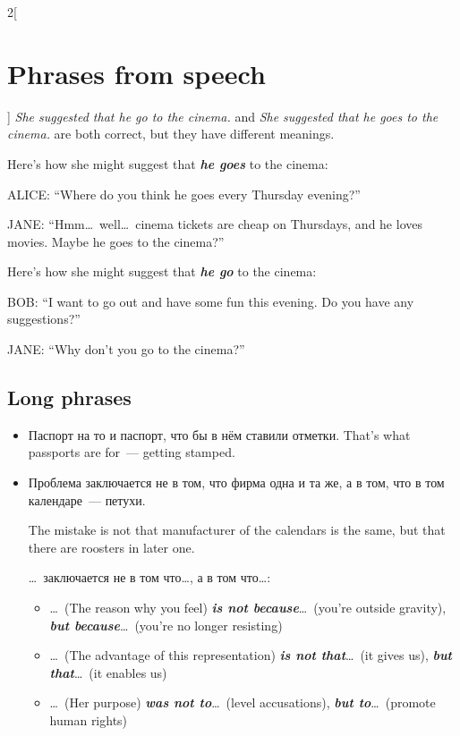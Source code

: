 \documentclass[10pt,a4paper]{article}
\newlength{\OriginalParIndent}
\newcommand\ex[1]{\textit{\textbf{{#1}}}}           %
\newenvironment{ItemizeWithOrigParIndent}
    {\begin{itemize}[leftmargin=\OriginalParIndent]}
    {\end{itemize}}
\begin{document}
\begin{multicols}{2}[\section{Phrases from speech}]
   \textit{She suggested that he go to the cinema.} and \textit{She suggested that he goes
   to the cinema.} are both correct, but they have different meanings.

   Here's how she might suggest that \ex{he goes} to the cinema:

   ALICE: ``Where do you think he goes every Thursday evening?''

   JANE: ``Hmm\dots\ well\dots\ cinema tickets are cheap on Thursdays, and he loves movies.
   Maybe he goes to the cinema?''

   Here's how she might suggest that \ex{he go} to the cinema:

   BOB: ``I want to go out and have some fun this evening. Do you have any suggestions?''

   JANE: ``Why don't you go to the cinema?''


\subsection{Long phrases}
\begin{ItemizeWithOrigParIndent}
   \item Паспорт на то и паспорт, что бы в нём ставили отметки. That's what passports are
   for~--- getting stamped.

   \item Проблема заключается не в том, что фирма одна и та же, а в том,
   что в том календаре~--- петухи.

   The mistake is not that manufacturer of the calendars is the same, but that there are
   roosters in later one.

   \dots\ заключается не в том что\dots, а в том что\dots:
   \begin{ItemizeWithOrigParIndent}
      \item \dots\ (The reason why you feel) \ex{is not because}\dots\ (you're outside gravity),
      \ex{but because}\dots\ (you're no longer resisting)

      \item \dots\ (The advantage of this representation) \ex{is not that}\dots\ (it gives us),
      \ex{but that}\dots\ (it enables us)

      \item \dots\ (Her purpose) \ex{was not to}\dots\ (level accusations),
      \ex{but to}\dots\ (promote human rights)
   \end{ItemizeWithOrigParIndent}


\end{ItemizeWithOrigParIndent}
\end{multicols}
\end{document}
